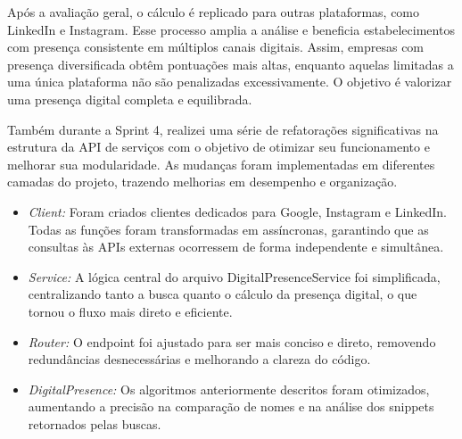 \indent \originaltab{}Após a avaliação geral, o cálculo é replicado para outras plataformas, como LinkedIn e Instagram. Esse processo amplia a análise e beneficia estabelecimentos com presença consistente em múltiplos canais digitais. Assim, empresas com presença diversificada obtêm pontuações mais altas, enquanto aquelas limitadas a uma única plataforma não são penalizadas excessivamente. O objetivo é valorizar uma presença digital completa e equilibrada.\par

\indent \originaltab{}Também durante a Sprint 4, realizei uma série de refatorações significativas na estrutura da API de serviços com o objetivo de otimizar seu funcionamento e melhorar sua modularidade. As mudanças foram implementadas em diferentes camadas do projeto, trazendo melhorias em desempenho e organização.\par

\begin{itemize}
\item \textit{Client:} Foram criados clientes dedicados para Google, Instagram e LinkedIn. Todas as funções foram transformadas em assíncronas, garantindo que as consultas às APIs externas ocorressem de forma independente e simultânea.
\end{itemize}

\begin{itemize}
\item \textit{Service:} A lógica central do arquivo DigitalPresenceService foi \originalinlinetab{}simplificada, centralizando tanto a busca quanto o cálculo da presença \originalinlinetab{}digital, o que tornou o fluxo mais direto e eficiente.
\end{itemize}

\begin{itemize}
\item \textit{Router:} O endpoint foi ajustado para ser mais conciso e direto, \originalinlinetab{}removendo redundâncias desnecessárias e melhorando a clareza do \originalinlinetab{}código.
\end{itemize}

\begin{itemize}
\item \textit{DigitalPresence:} Os algoritmos anteriormente descritos foram \originalinlinetab{}otimizados, aumentando a precisão na comparação de nomes e na \originalinlinetab{}análise dos snippets retornados pelas buscas.
\end{itemize}

